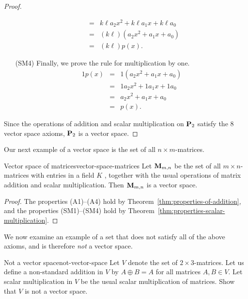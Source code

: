 \begin{proof}
\begin{itemize}
\begin{eqnarray*}
               &=&  k\ell a_2x^2 + k\ell a_1x + k\ell a_0 \\
               &=& (k\ell) (a_2x^2 + a_1x + a_0)\\
               &=& (k\ell) p(x).
    \end{eqnarray*}
  \item[(SM4)] Finally, we prove the rule for multiplication by one.
    \begin{eqnarray*}
      1p(x) &=& 1 (a_2x^2 + a_1x + a_0)\\
            &=& 1a_2x^2 + 1a_1x + 1a_0\\
            &=& a_2x^2 + a_1x + a_0\\
            &=& p(x).
    \end{eqnarray*}
  \end{itemize}
  Since the operations of addition and scalar multiplication on
  $\mathbf{P}_2$ satisfy the $8$ vector space axioms, $\mathbf{P}_2$ is a vector
  space.
\end{proof}

Our next example of a vector space is the set of all
$n\times m$-matrices.

\begin{example}{Vector space of matrices}{vector-space-matrices}
  Let $\mathbf{M}_{m,n}$%
   be the set of all $m\times n$-matrices
  with entries in a field $K$%
  , together with the usual operations
  of matrix addition and scalar multiplication. Then $\mathbf{M}_{m,n}$ is a
  vector space.
\end{example}

\begin{proof}
  The properties (A1)--(A4) hold by
  Theorem~\ref{thm:properties-of-addition}, and the properties
  (SM1)--(SM4) hold by Theorem~\ref{thm:properties-scalar-multiplication}.
\end{proof}

We now examine an example of a set that does not satisfy all of the
above axioms, and is therefore \textit{not} a vector space.

\begin{example}{Not a vector space}{not-vector-space}
  Let $V$ denote the set of $2 \times 3$-matrices. Let us define a
  non-standard addition in $V$ by $A \oplus B = A$ for all matrices
  $A,B\in V$. Let scalar multiplication in $V$ be the usual scalar
  multiplication of matrices. Show that $V$ is not a vector space.
\end{example}

